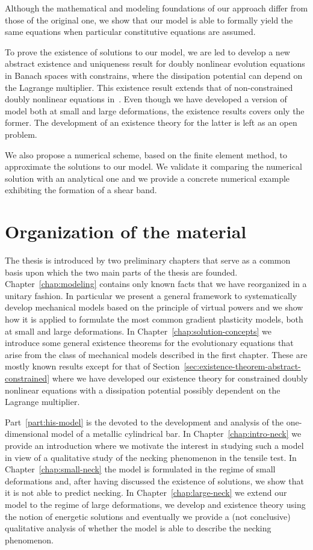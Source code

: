 \documentclass[a4paper,10pt,oneside]{amsbook}
\numberwithin{section}{chapter}
\numberwithin{equation}{chapter}
\theoremstyle{definition}
\begin{document}
Although the mathematical and modeling foundations of our approach differ from those of the original one, we show that our model is able to formally yield the same equations when particular constitutive equations are assumed.

To prove the existence of solutions to our model, we are led to develop a new abstract existence and uniqueness result for doubly nonlinear evolution equations in Banach spaces with constrains, where the dissipation potential can depend on the Lagrange multiplier. This existence result extends that of non-constrained doubly nonlinear equations in~\cite{roubicek-pde}. Even though we have developed a version of model both at small and large deformations, the existence results covers only the former. The development of an existence theory for the latter is left as an open problem.

We also propose a numerical scheme, based on the finite element method, to approximate the solutions to our model. We validate it comparing the numerical solution with an analytical one and we provide a concrete numerical example exhibiting the formation of a shear band.

\section*{Organization of the material}

The thesis is introduced by two preliminary chapters that serve as a common basis upon which the two main parts of the thesis are founded. Chapter~\ref{chap:modeling} contains only known facts that we have reorganized in a unitary fashion. In particular we present a general framework to systematically develop mechanical models based on the principle of virtual powers and we show how it is applied to formulate the most common gradient plasticity models, both at small and large deformations. In Chapter~\ref{chap:solution-concepts} we introduce some general existence theorems for the evolutionary equations that arise from the class of mechanical models described in the first chapter. These are mostly known results except for that of Section~\ref{sec:existence-theorem-abstract-constrained} where we have developed our existence theory for constrained doubly nonlinear equations with a dissipation potential possibly dependent on the Lagrange multiplier.

Part~\ref{part:his-model} is the devoted to the development and analysis of the one-dimensional model of a metallic cylindrical bar. In Chapter~\ref{chap:intro-neck} we provide an introduction where we motivate the interest in studying such a model in view of a qualitative study of the necking phenomenon in the tensile test. In Chapter~\ref{chap:small-neck} the model is formulated in the regime of small deformations and, after having discussed the existence of solutions, we show that it is not able to predict necking. In Chapter~\ref{chap:large-neck} we extend our model to the regime of large deformations, we develop and existence theory using the notion of energetic solutions and eventually we provide a (not conclusive) qualitative analysis of whether the model is able to describe the necking phenomenon.
\end{document}
